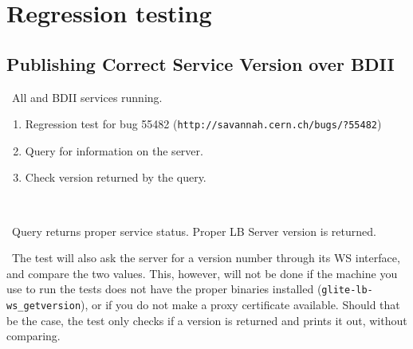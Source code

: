 \section{Regression testing}

\subsection{Publishing Correct Service Version over BDII}
\req\ All \LB and BDII services running.

\what
\begin{enumerate}
\item Regression test for bug 55482 (\texttt{http://savannah.cern.ch/bugs/?55482})
\item Query for information on the server.
\item Check version returned by the query.
\end{enumerate}

\how\ 

\result\ Query returns proper service status. Proper LB Server version is returned.

\note\ The test will also ask the \LB server for a version number through its WS interface, and compare the two values. This, however, will not be done if the machine you use to run the tests does not have the proper binaries installed (\texttt{glite-lb-ws\_getversion}), or if you do not make a proxy certificate available. Should that be the case, the test only checks if a version is returned and prints it out, without comparing.

